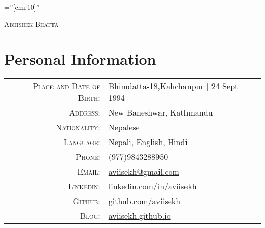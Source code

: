 \documentclass[a4paper,10pt]{article}
\begin{document}

\pagestyle{empty} %

\font\fb=''[cmr10]'' %

\par{\centering
		{\huge \textsc{Abhishek} \textsc{Bhatta}
	}\bigskip\par}


\section{Personal Information}

\begin{tabular}{rl}
    \textsc{Place and Date of Birth:} & Bhimdatta-18,Kahchanpur  | 24 Sept 1994 \\
    \textsc{Address:}   & New Baneshwar, Kathmandu \\
    \textsc{Nationality:} & Nepalese\\
    \textsc{Language:} & Nepali, English, Hindi\\
    \textsc{Phone:}     & (977)9843288950\\
    \textsc{Email:}     & \href{mailto:aviisekh@gmail.com}{aviisekh@gmail.com}\\
    \textsc{Linkedin:} & \href{https://www.linkedin.com/in/aviisekh}{linkedin.com/in/aviisekh}\\
    \textsc{Github:} & \href{https://www.github.com/aviisekh}{github.com/aviisekh}\\
    \textsc{Blog:} & \href{https://aviisekh.github.io}{aviisekh.github.io}\\
\end{tabular}

\end{document}
